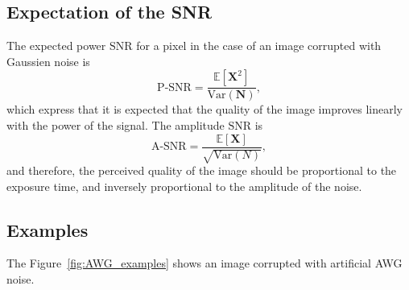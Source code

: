 \subsection{Expectation of the \gls{SNR}}
The expected power $\text{SNR}$ for a
pixel in the case of an image corrupted with Gaussien noise is
\begin{equation}
  \text{P-SNR} = \frac{\mathbb{E}[\bm{X}^2]}{\text{Var}(\bm{N})},
  \label{eq:power_SNR_Gaussian}
\end{equation}
which express that it is expected that the quality of the image
improves linearly with the power of the signal. The amplitude
$\text{SNR}$ is
\begin{equation}
  \text{A-SNR} = \frac{\mathbb{E}[\bm{X}]}{\sqrt{\text{Var}(N)}},
  \label{eq:amplitude_SNR_Gaussian}
\end{equation}
and therefore, the perceived quality of the image should be
proportional to the exposure time, and inversely proportional to the
amplitude of the noise.

\subsection*{Examples}

The Figure~\ref{fig:AWG_examples} shows an image corrupted with
artificial \gls{AWG} noise. 

